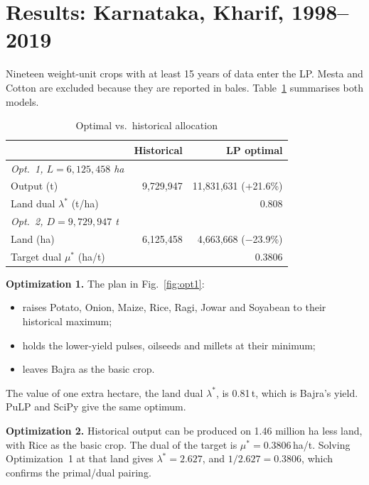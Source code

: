 \documentclass[conference]{IEEEtran}
\begin{document}
\section{Results: Karnataka, Kharif, 1998--2019}
Nineteen weight-unit crops with at least 15 years of data enter the LP. Mesta and Cotton are
excluded because they are reported in bales. Table~\ref{tab:res} summarises both models.

\begin{table}[!t]
\centering
\caption{Optimal vs.\ historical allocation}\label{tab:res}
\begin{tabular}{@{}lrr@{}}
\toprule
 & Historical & LP optimal\\
\midrule
\emph{Opt.~1, $L=6{,}125{,}458$ ha} & & \\
\quad Output (t) & 9{,}729{,}947 & 11{,}831{,}631 (+21.6\%)\\
\quad Land dual $\lambda^*$ (t/ha) & & 0.808\\
\emph{Opt.~2, $D=9{,}729{,}947$ t} & & \\
\quad Land (ha) & 6{,}125{,}458 & 4{,}663{,}668 ($-$23.9\%)\\
\quad Target dual $\mu^*$ (ha/t) & & 0.3806\\
\bottomrule
\end{tabular}
\end{table}

\textbf{Optimization 1.} The plan in Fig.~\ref{fig:opt1}:
\begin{itemize}
  \item raises Potato, Onion, Maize, Rice, Ragi, Jowar and Soyabean to their historical maximum;
  \item holds the lower-yield pulses, oilseeds and millets at their minimum;
  \item leaves Bajra as the basic crop.
\end{itemize}
The value of one extra hectare, the land dual $\lambda^*$, is 0.81\,t, which is Bajra's yield.
PuLP and SciPy give the same optimum.

\textbf{Optimization 2.} Historical output can be produced on 1.46 million ha less land, with
Rice as the basic crop. The dual of the target is $\mu^*=0.3806$\,ha/t. Solving
Optimization~1 at that land gives $\lambda^*=2.627$, and $1/2.627=0.3806$, which confirms the
primal/dual pairing.

\end{document}
